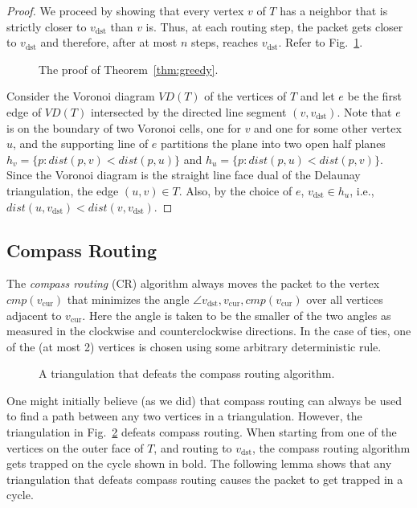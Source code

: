 \documentclass[final]{siamltex}
\newcommand{\centeripe}[1]{\begin{center}\Ipe{#1}\end{center}}
\newcommand{\seclabel}[1]{\label{sec:#1}}
\newcommand{\figlabel}[1]{\label{fig:#1}}
\newcommand{\figref}[1]{\mbox{Fig.~\ref{fig:#1}}}
\newcommand{\thmref}[1]{Theorem~\ref{thm:#1}}
\newcommand{\dist}{\mathit{dist}}
\newcommand{\vdest}{v_\mathrm{dst}}
\newcommand{\vcur}{v_\mathrm{cur}}
\newcommand{\compass}[1]{\mathit{cmp}(#1)}
\newcommand{\VD}{\mathit{VD}}
\begin{document}
\begin{proof}
We proceed by showing that every vertex $v$ of $T$ has a neighbor
that is strictly closer to $\vdest$ than $v$ is.  Thus, at each
routing step, the packet gets closer to $\vdest$ and therefore, after at
most $n$ steps, reaches $\vdest$.  Refer to \figref{greedy-proof}.

\begin{figure}
\centeripe{greedy-proof}
\caption{The proof of \thmref{greedy}.}
\figlabel{greedy-proof}
\end{figure}

Consider the Voronoi diagram \cite{obs92} $\VD(T)$ of the vertices of
$T$ and let $e$ be the first edge of $\VD(T)$ intersected by the
directed line segment $(v,\vdest)$.  Note that $e$ is on the boundary
of two Voronoi cells, one for $v$ and one for some other vertex $u$,
and the supporting line of $e$ partitions the plane into two open half
planes $h_v=\{p:\dist(p,v)<\dist(p,u)\}$ and
$h_u=\{p:\dist(p,u)<\dist(p,v)\}$.  Since the Voronoi diagram is the
straight line face dual of the Delaunay triangulation, the edge
$(u,v)\in T$.  Also, by the choice of $e$, $\vdest\in h_u$, i.e.,
$\dist(u,\vdest)<\dist(v,\vdest)$. 
\qquad\end{proof}


\subsection{Compass Routing}\seclabel{compass}

The {\em compass routing\/} (CR) algorithm always moves the packet to the
vertex $\compass{\vcur}$ that minimizes the angle
$\angle\vdest,\vcur,\compass{\vcur}$ over all vertices adjacent to
$\vcur$.  Here the angle is taken to be the smaller of the two angles
as measured in the clockwise and counterclockwise directions.  In the
case of ties, one of the (at most 2) vertices is chosen using some
arbitrary deterministic rule.

\begin{figure}
\centeripe{compass-failure}
\caption{A triangulation that defeats the compass routing algorithm.}
\figlabel{bad-compass}
\end{figure}
One might initially believe (as we did) that compass routing can
always be used to find a path between any two vertices in a
triangulation.  However, the triangulation in \figref{bad-compass}
defeats compass routing.  When starting from one of the vertices on
the outer face of $T$, and routing to $\vdest$, the compass routing
algorithm gets trapped on the cycle shown in bold.  The following
lemma shows that any triangulation that defeats compass routing causes
the packet to get trapped in a cycle.
\end{document}
